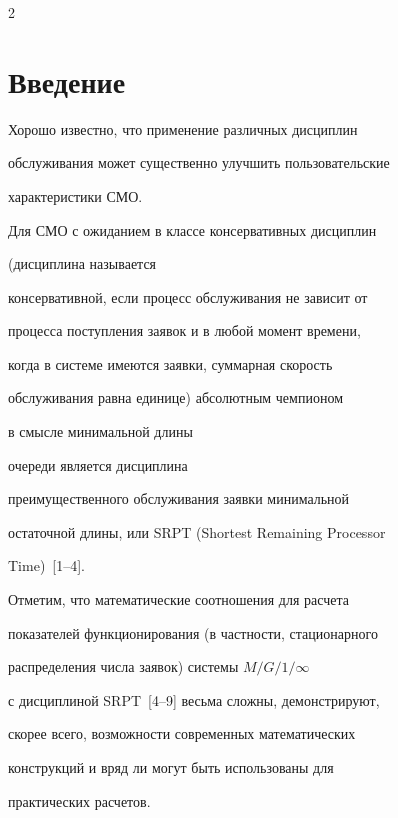       \begin{multicols}{2}





      \label{st\stat}





\section{Введение}





Хорошо известно, что применение различных дисциплин


обслуживания может существенно улучшить пользовательские


характеристики СМО.





Для СМО с ожиданием в классе консервативных дисциплин


(дисциплина называется


консервативной, если процесс обслуживания не зависит от


процесса поступления заявок и в любой момент времени,


когда в системе имеются заявки, суммарная скорость


обслуживания равна единице) абсолютным чемпионом


в смысле минимальной \mbox{длины}


 очереди является дисциплина


преимущественного обслуживания заявки минимальной


остаточной длины, или SRPT (Shortest Remaining Processor


Time)~[1--4].





Отметим, что математические соотношения для расчета


показателей функционирования (в частности, стационарного


распределения числа заявок) системы $M/G/1/\infty$


с дисциплиной SRPT~[4--9] весьма сложны, демонстрируют,


скорее всего, возможности современных математических


конструкций и вряд ли могут быть использованы для


практических расчетов.



\end{multicols}
